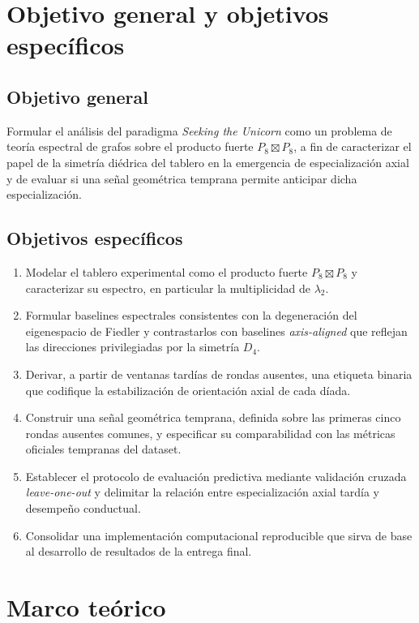 \documentclass[journal]{IEEEtran}
\begin{document}
\section{Objetivo general y objetivos específicos}

\subsection{Objetivo general}

Formular el análisis del paradigma \emph{Seeking the Unicorn} como un problema de teoría espectral de grafos sobre el producto fuerte $P_8 \boxtimes P_8$, a fin de caracterizar el papel de la simetría diédrica del tablero en la emergencia de especialización axial y de evaluar si una señal geométrica temprana permite anticipar dicha especialización.

\subsection{Objetivos específicos}

\begin{enumerate}
\item Modelar el tablero experimental como el producto fuerte $P_8 \boxtimes P_8$ y caracterizar su espectro, en particular la multiplicidad de $\lambda_2$.
\item Formular baselines espectrales consistentes con la degeneración del eigenespacio de Fiedler y contrastarlos con baselines \emph{axis-aligned} que reflejan las direcciones privilegiadas por la simetría $D_4$.
\item Derivar, a partir de ventanas tardías de rondas ausentes, una etiqueta binaria que codifique la estabilización de orientación axial de cada díada.
\item Construir una señal geométrica temprana, definida sobre las primeras cinco rondas ausentes comunes, y especificar su comparabilidad con las métricas oficiales tempranas del dataset.
\item Establecer el protocolo de evaluación predictiva mediante validación cruzada \emph{leave-one-out} y delimitar la relación entre especialización axial tardía y desempeño conductual.
\item Consolidar una implementación computacional reproducible que sirva de base al desarrollo de resultados de la entrega final.
\end{enumerate}

\section{Marco teórico}
\end{document}
